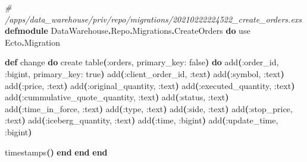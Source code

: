 \documentclass[
  oneside]{book}
\newenvironment{Shaded}{\begin{snugshade}}{\end{snugshade}}
\newcommand{\CommentTok}[1]{\textcolor[rgb]{0.56,0.35,0.01}{\textit{#1}}}
\newcommand{\ConstantTok}[1]{\textcolor[rgb]{0.56,0.35,0.01}{#1}}
\newcommand{\FunctionTok}[1]{\textcolor[rgb]{0.13,0.29,0.53}{\textbf{#1}}}
\newcommand{\ImportTok}[1]{#1}
\newcommand{\KeywordTok}[1]{\textcolor[rgb]{0.13,0.29,0.53}{\textbf{#1}}}
\newcommand{\NormalTok}[1]{#1}
\newcommand{\OperatorTok}[1]{\textcolor[rgb]{0.81,0.36,0.00}{\textbf{#1}}}
\newcommand{\VariableTok}[1]{\textcolor[rgb]{0.00,0.00,0.00}{#1}}
\begin{document}
\begin{Shaded}
\begin{Highlighting}[]
\CommentTok{\# /apps/data\_warehouse/priv/repo/migrations/20210222224522\_create\_orders.exs}
\KeywordTok{defmodule} \ConstantTok{DataWarehouse}\OperatorTok{.}\ConstantTok{Repo}\OperatorTok{.}\ConstantTok{Migrations}\OperatorTok{.}\ConstantTok{CreateOrders} \KeywordTok{do}
  \ImportTok{use} \ConstantTok{Ecto}\OperatorTok{.}\ConstantTok{Migration}

  \KeywordTok{def}\NormalTok{ change }\KeywordTok{do}
\NormalTok{    create table}\FunctionTok{(}\VariableTok{:orders}\NormalTok{, }\VariableTok{primary\_key:} \ConstantTok{false}\FunctionTok{)} \KeywordTok{do}
\NormalTok{      add}\FunctionTok{(}\VariableTok{:order\_id}\NormalTok{, }\VariableTok{:bigint}\NormalTok{, }\VariableTok{primary\_key:} \ConstantTok{true}\FunctionTok{)}
\NormalTok{      add}\FunctionTok{(}\VariableTok{:client\_order\_id}\NormalTok{, }\VariableTok{:text}\FunctionTok{)}
\NormalTok{      add}\FunctionTok{(}\VariableTok{:symbol}\NormalTok{, }\VariableTok{:text}\FunctionTok{)}
\NormalTok{      add}\FunctionTok{(}\VariableTok{:price}\NormalTok{, }\VariableTok{:text}\FunctionTok{)}
\NormalTok{      add}\FunctionTok{(}\VariableTok{:original\_quantity}\NormalTok{, }\VariableTok{:text}\FunctionTok{)}
\NormalTok{      add}\FunctionTok{(}\VariableTok{:executed\_quantity}\NormalTok{, }\VariableTok{:text}\FunctionTok{)}
\NormalTok{      add}\FunctionTok{(}\VariableTok{:cummulative\_quote\_quantity}\NormalTok{, }\VariableTok{:text}\FunctionTok{)}
\NormalTok{      add}\FunctionTok{(}\VariableTok{:status}\NormalTok{, }\VariableTok{:text}\FunctionTok{)}
\NormalTok{      add}\FunctionTok{(}\VariableTok{:time\_in\_force}\NormalTok{, }\VariableTok{:text}\FunctionTok{)}
\NormalTok{      add}\FunctionTok{(}\VariableTok{:type}\NormalTok{, }\VariableTok{:text}\FunctionTok{)}
\NormalTok{      add}\FunctionTok{(}\VariableTok{:side}\NormalTok{, }\VariableTok{:text}\FunctionTok{)}
\NormalTok{      add}\FunctionTok{(}\VariableTok{:stop\_price}\NormalTok{, }\VariableTok{:text}\FunctionTok{)}
\NormalTok{      add}\FunctionTok{(}\VariableTok{:iceberg\_quantity}\NormalTok{, }\VariableTok{:text}\FunctionTok{)}
\NormalTok{      add}\FunctionTok{(}\VariableTok{:time}\NormalTok{, }\VariableTok{:bigint}\FunctionTok{)}
\NormalTok{      add}\FunctionTok{(}\VariableTok{:update\_time}\NormalTok{, }\VariableTok{:bigint}\FunctionTok{)}

\NormalTok{      timestamps}\FunctionTok{()}
    \KeywordTok{end}
  \KeywordTok{end}
\KeywordTok{end}
\end{Highlighting}
\end{Shaded}
\end{document}
